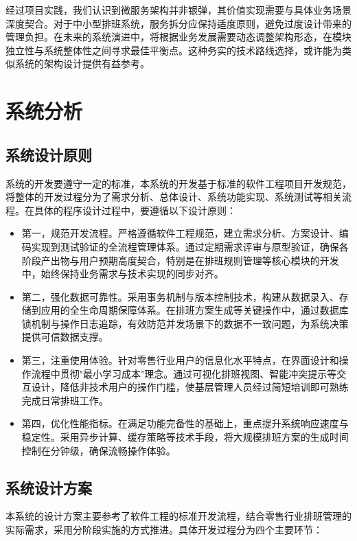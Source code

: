 \documentclass{ctexart}
\begin{document}
经过项目实践，我们认识到微服务架构并非银弹，其价值实现需要与具体业务场景深度契合。对于中小型排班系统，服务拆分应保持适度原则，避免过度设计带来的管理负担。在未来的系统演进中，将根据业务发展需要动态调整架构形态，在模块独立性与系统整体性之间寻求最佳平衡点。这种务实的技术路线选择，或许能为类似系统的架构设计提供有益参考。

\section{系统分析}
\subsection{系统设计原则}
系统的开发要遵守一定的标准，本系统的开发基于标准的软件工程项目开发规范，将整体的开发过程分为了需求分析、总体设计、系统功能实现、系统测试等相关流程。在具体的程序设计过程中，要遵循以下设计原则：
\begin{itemize}
    \item 第一，规范开发流程。严格遵循软件工程规范，建立需求分析、方案设计、编码实现到测试验证的全流程管理体系。通过定期需求评审与原型验证，确保各阶段产出物与用户预期高度契合，特别是在排班规则管理等核心模块的开发中，始终保持业务需求与技术实现的同步对齐。
    
    \item 第二，强化数据可靠性。采用事务机制与版本控制技术，构建从数据录入、存储到应用的全生命周期保障体系。在排班方案生成等关键操作中，通过数据库锁机制与操作日志追踪，有效防范并发场景下的数据不一致问题，为系统决策提供可信数据支撑。
    
    \item 第三，注重使用体验。针对零售行业用户的信息化水平特点，在界面设计和操作流程中贯彻"最小学习成本"理念。通过可视化排班视图、智能冲突提示等交互设计，降低非技术用户的操作门槛，使基层管理人员经过简短培训即可熟练完成日常排班工作。
    
    \item 第四，优化性能指标。在满足功能完备性的基础上，重点提升系统响应速度与稳定性。采用异步计算、缓存策略等技术手段，将大规模排班方案的生成时间控制在分钟级，确保流畅操作体验。
\end{itemize}

\subsection{系统设计方案}
本系统的设计方案主要参考了软件工程的标准开发流程，结合零售行业排班管理的实际需求，采用分阶段实施的方式推进。具体开发过程分为四个主要环节：
\end{document}
